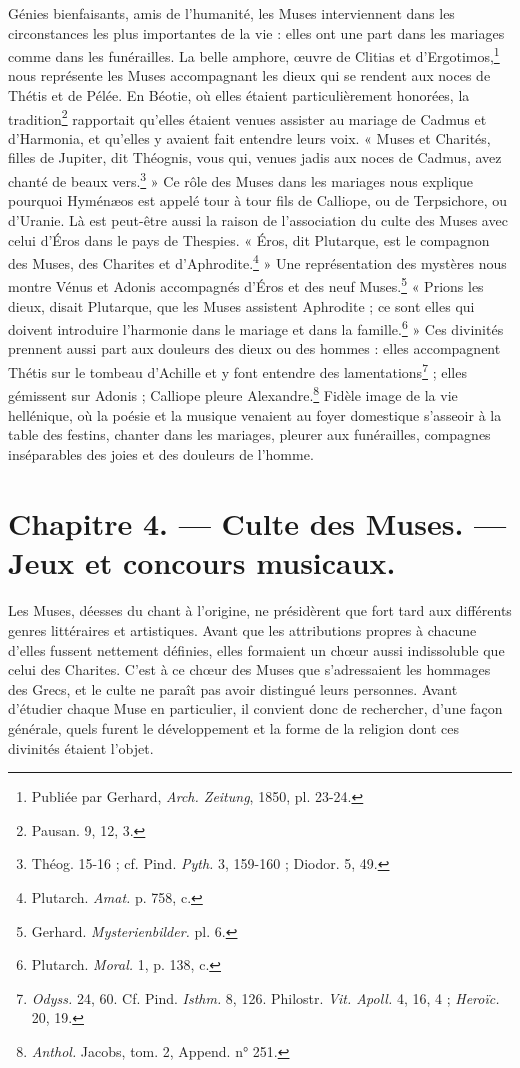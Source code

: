 \documentclass[landscape, a4paper, 11pt, oneside, polutonikogreek, french]{article}
\begin{document}
Génies bienfaisants, amis de l'humanité, les Muses interviennent dans les circonstances les plus importantes de la vie : elles ont une part dans les mariages comme dans les funérailles. La belle amphore, œuvre de Clitias et d'Ergotimos,\footnote{Publiée par Gerhard, \emph{Arch. Zeitung}, 1850, pl. 23-24.} nous représente les Muses accompagnant les dieux qui se rendent aux noces de Thétis et de Pélée. En Béotie, où elles étaient particulièrement honorées, la tradition\footnote{Pausan. 9, 12, 3.} rapportait qu'elles étaient venues assister au mariage de Cadmus et d'Harmonia, et qu'elles y avaient fait entendre leurs voix. « Muses et Charités, filles de Jupiter, dit Théognis, vous qui, venues jadis aux noces de Cadmus, avez chanté de beaux vers.\footnote{Théog. 15-16 ; cf. Pind. \emph{Pyth.} 3, 159-160 ; Diodor. 5, 49.} » Ce rôle des Muses dans les mariages nous explique pourquoi Hyménæos est appelé tour à tour fils de Calliope, ou de Terpsichore, ou d'Uranie. Là est peut-être aussi la raison de l'association du culte des Muses avec celui d'Éros dans le pays de Thespies. « Éros, dit Plutarque, est le compagnon des Muses, des Charites et d'Aphrodite.\footnote{Plutarch. \emph{Amat.} p. 758, c.} » Une représentation des mystères nous montre Vénus et Adonis accompagnés d'Éros et des neuf Muses.\footnote{Gerhard. \emph{Mysterienbilder.} pl. 6.} « Prions les dieux, disait Plutarque, que les Muses assistent Aphrodite ; ce sont elles qui doivent introduire l'harmonie dans le mariage et dans la famille.\footnote{Plutarch. \emph{Moral.} 1, p. 138, c.} » Ces divinités prennent aussi part aux douleurs des dieux ou des hommes : elles accompagnent Thétis sur le tombeau d'Achille et y font entendre des lamentations\footnote{\emph{Odyss.} 24, 60. Cf. Pind. \emph{Isthm.} 8, 126. Philostr. \emph{Vit. Apoll.} 4, 16, 4 ; \emph{Heroïc.} 20, 19.} ; elles gémissent sur Adonis ; Calliope pleure Alexandre.\footnote{\emph{Anthol.} Jacobs, tom. 2, Append. n° 251.} Fidèle image de la vie hellénique, où la poésie et la musique venaient au foyer domestique s'asseoir à la table des festins, chanter dans les mariages, pleurer aux funérailles, compagnes inséparables des joies et des douleurs de l'homme.
\clearpage
\section{Chapitre 4. --- Culte des Muses. --- Jeux et concours musicaux.}
\paragraph{}
Les Muses, déesses du chant à l'origine, ne présidèrent que fort tard aux différents genres littéraires et artistiques. Avant que les attributions propres à chacune d'elles fussent nettement définies, elles formaient un chœur aussi indissoluble que celui des Charites. C'est à ce chœur des Muses que s'adressaient les hommages des Grecs, et le culte ne paraît pas avoir distingué leurs personnes. Avant d'étudier chaque Muse en particulier, il convient donc de rechercher, d'une façon générale, quels furent le développement et la forme de la religion dont ces divinités étaient l'objet.
\end{document}
